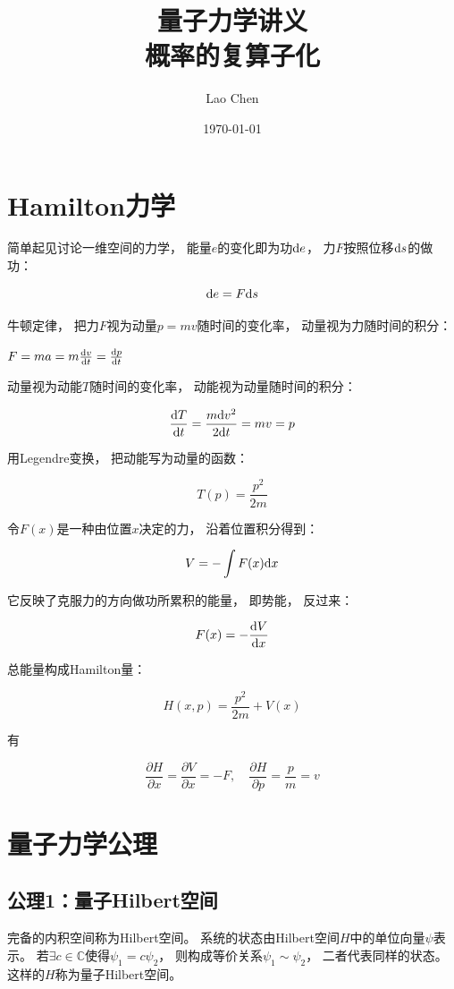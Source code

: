 \documentclass[10pt, openany]{book}
\begin{document}
\frontmatter
\title{\textbf{量子力学讲义}\\ \large 概率的复算子化}
\author{Lao Chen}
\date{\today}
\maketitle
\tableofcontents

\mainmatter

\chapter{Hamilton力学}

简单起见讨论一维空间的力学，
能量$e$的变化即为功$\text d e$，
力$F$按照位移$\text d s$的做功：

$$
\text d e = F \text d s
$$

牛顿定律，
把力$F$视为动量$p=mv$随时间的变化率，
动量视为力随时间的积分：

$
F = ma
= m\frac{\text dv}{\text dt}
= \frac{\text dp}{\text dt}
$

动量视为动能$T$随时间的变化率，
动能视为动量随时间的积分：

$$
\frac{\text dT}{\text dt}
=\frac{m\text d v^2}{2 \text dt}
=mv = p
$$

用Legendre变换，
把动能写为动量的函数：

$$
T(p) = \frac{p^2}{2m}
$$

令$F(x)$是一种由位置$x$决定的力，
沿着位置积分得到：

$$
V = -\int F(x) \text d x
$$

它反映了克服力的方向做功所累积的能量，
即势能，
反过来：

$$
F(x) = -\frac{\text d V}{\text d x}
$$

总能量构成Hamilton量：

$$
H(x,p) = \frac{p^2}{2m} + V(x)
$$

有

$$
\frac{\partial H}{\partial x}
=\frac{\partial V}{\partial x}
= -F, \quad 
\frac{\partial H}{\partial p}
=\frac{p}{m}
= v
$$

\chapter{量子力学公理}

\section{公理1：量子Hilbert空间}

完备的内积空间称为Hilbert空间。
系统的状态由Hilbert空间$H$中的单位向量$\psi$表示。
若$\exists c\in\mathbb C$使得$\psi_1 = c\psi_2$，
则构成等价关系$\psi_1 \sim \psi_2$，
二者代表同样的状态。
这样的$H$称为量子Hilbert空间。
\end{document}
